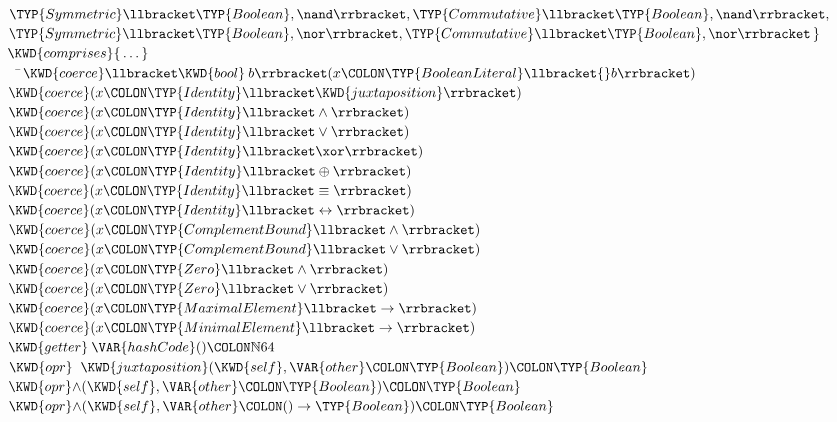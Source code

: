 \begin{Fortress}
\(              \TYP{Symmetric}\llbracket\TYP{Boolean},\nand\rrbracket, \TYP{Commutative}\llbracket\TYP{Boolean},\nand\rrbracket,\)\\
\(              \TYP{Symmetric}\llbracket\TYP{Boolean},\nor\rrbracket, \TYP{Commutative}\llbracket\TYP{Boolean},\nor\rrbracket\,\}\)\-\\\poptabs
\(    \KWD{comprises} \{\,\ldots\,\}\)\-\\\poptabs
{\tt~~}\pushtabs\=\+\(  \KWD{coerce}\llbracket\KWD{bool}\:b\rrbracket(x\COLON \TYP{BooleanLiteral}\llbracket{}b\rrbracket)\)\\
\(  \KWD{coerce}(x\COLON \TYP{Identity}\llbracket\KWD{juxtaposition}\rrbracket)\)\\
\(  \KWD{coerce}(x\COLON \TYP{Identity}\llbracket\wedge\rrbracket)\)\\
\(  \KWD{coerce}(x\COLON \TYP{Identity}\llbracket\vee\rrbracket)\)\\
\(  \KWD{coerce}(x\COLON \TYP{Identity}\llbracket\xor\rrbracket)\)\\
\(  \KWD{coerce}(x\COLON \TYP{Identity}\llbracket\oplus\rrbracket)\)\\
\(  \KWD{coerce}(x\COLON \TYP{Identity}\llbracket\equiv\rrbracket)\)\\
\(  \KWD{coerce}(x\COLON \TYP{Identity}\llbracket\leftrightarrow\rrbracket)\)\\
\(  \KWD{coerce}(x\COLON \TYP{ComplementBound}\llbracket\wedge\rrbracket)\)\\
\(  \KWD{coerce}(x\COLON \TYP{ComplementBound}\llbracket\vee\rrbracket)\)\\
\(  \KWD{coerce}(x\COLON \TYP{Zero}\llbracket\wedge\rrbracket)\)\\
\(  \KWD{coerce}(x\COLON \TYP{Zero}\llbracket\vee\rrbracket)\)\\
\(  \KWD{coerce}(x\COLON \TYP{MaximalElement}\llbracket\rightarrow\rrbracket)\)\\
\(  \KWD{coerce}(x\COLON \TYP{MinimalElement}\llbracket\rightarrow\rrbracket)\)\\
\(  \KWD{getter}\:\VAR{hashCode}()\COLON \mathbb{N}64\)\\
\(  \KWD{opr}\;\;\KWD{juxtaposition}(\KWD{self}, \VAR{other}\COLON \TYP{Boolean})\COLON \TYP{Boolean}\)\\
\(  \KWD{opr} \mathord{\wedge}(\KWD{self}, \VAR{other}\COLON \TYP{Boolean})\COLON \TYP{Boolean}\)\\
\(  \KWD{opr} \mathord{\wedge}(\KWD{self}, \VAR{other}\COLON ()\rightarrow\TYP{Boolean})\COLON \TYP{Boolean}\)\\

\end{Fortress}
